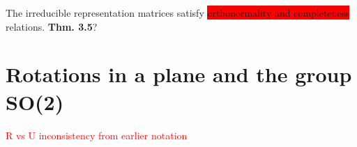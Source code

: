 \begin{example}

\end{example}



The irreducible representation matrices satisfy \colorbox{red}{orthonormality and completeness} relations.\textbf{ Thm. 3.5}?

\section{Rotations in a plane and the group SO(2)}

\textcolor{red}{R vs U inconsistency from earlier notation}
